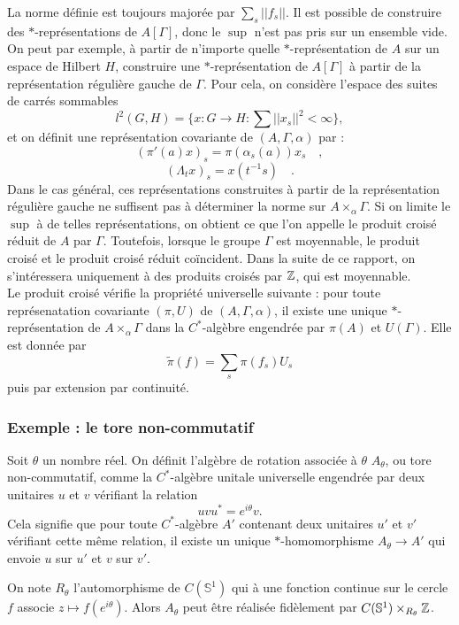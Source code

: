 La norme définie est toujours majorée par $\sum_s ||f_s||$. Il est possible de construire des $*$-représentations de $A[\Gamma]$, donc le $\sup$ n'est pas pris sur un ensemble vide. On peut par exemple, à partir de n'importe quelle $*$-représentation de $A$ sur un espace de Hilbert $H$, construire une $*$-représentation de $A[\Gamma]$ à partir de la représentation régulière gauche de $\Gamma$. Pour cela, on considère l'espace des suites de carrés sommables 
\[l^2(G,H)=\{x:G\rightarrow H : \sum||x_s||^2<\infty\} , \]
et on définit une représentation covariante de $(A,\Gamma,\alpha)$ par :
\[(\pi'(a)x)_s=\pi(\alpha_s(a))x_s\quad,\]
\[(\Lambda_t x)_s=x(t^{-1}s)\quad. \]
Dans le cas général, ces représentations construites à partir de la représentation régulière gauche ne suffisent pas à déterminer la norme sur $A\times_\alpha \Gamma$. Si on limite le $\sup$ à de telles représentations, on obtient ce que l'on appelle le produit croisé réduit de $A$ par $\Gamma$. Toutefois, lorsque le groupe $\Gamma$ est moyennable, le produit croisé et le produit croisé réduit coïncident.
Dans la suite de ce rapport, on s'intéressera uniquement à des produits croisés par $\mathbb Z$, qui est moyennable. \\

Le produit croisé vérifie la propriété universelle suivante : pour toute représenatation covariante $(\pi,U)$ de $(A,\Gamma,\alpha)$, il existe une unique $*$-représentation de $A\times_\alpha \Gamma$ dans la $C^*$-algèbre engendrée par $\pi(A)$ et $U(\Gamma)$. Elle est donnée par 
\[\tilde\pi(f)=\sum_s \pi(f_s)U_s\]
puis par extension par continuité.

\subsubsection{Exemple : le tore non-commutatif}

\begin{definition}
Soit $\theta$ un nombre réel. On définit l'algèbre de rotation associée à $\theta$ $A_\theta$, ou tore non-commutatif, comme la $C^*$-algèbre unitale universelle engendrée par deux unitaires $u$ et $v$ vérifiant la relation 
\[uvu^*= e^{i\theta}v.\]
Cela signifie que pour toute $C^*$-algèbre $A'$ contenant deux unitaires $u'$ et $v'$ vérifiant cette même relation, il existe un unique $*$-homomorphisme $A_\theta\rightarrow A'$ qui envoie $u$ sur $u'$ et $v$ sur $v'$. 
\end{definition}

On note $R_\theta$ l'automorphisme de $C(\mathbb S^1)$ qui à une fonction continue sur le cercle $f$ associe $z\mapsto f(e^{i\theta})$. Alors $A_\theta$ peut être réalisée fidèlement par $C(\mathbb S^1)\times_{R_\theta} \mathbb Z$.\\

